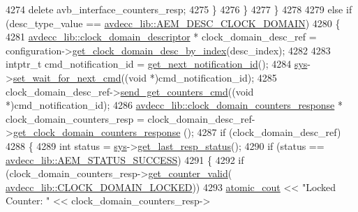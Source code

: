 \begin{DoxyCode}
4274                 \textcolor{keyword}{delete} avb\_interface\_counters\_resp;
4275             \}
4276         \}
4277     \}
4278 
4279     \textcolor{keywordflow}{else} \textcolor{keywordflow}{if} (desc\_type\_value == \hyperlink{namespaceavdecc__lib_ac7b7d227e46bc72b63ee9e9aae15902fa9a2f5c4896329bb03b27b36e98ed5e93}{avdecc\_lib::AEM\_DESC\_CLOCK\_DOMAIN})
4280     \{
4281         \hyperlink{classavdecc__lib_1_1clock__domain__descriptor}{avdecc\_lib::clock\_domain\_descriptor} * clock\_domain\_desc\_ref = 
      configuration->\hyperlink{classavdecc__lib_1_1configuration__descriptor_ab5603e0fa2cc0695b240fe856b62776d}{get\_clock\_domain\_desc\_by\_index}(desc\_index);
4282 
4283         intptr\_t cmd\_notification\_id = \hyperlink{classcmd__line_a57486218387d1aa9d262eb7c176154ad}{get\_next\_notification\_id}();
4284         \hyperlink{classcmd__line_a485db4800e331cb4052c447fdf5d154e}{sys}->\hyperlink{classavdecc__lib_1_1system_a26b769584f10225077da47583edda33e}{set\_wait\_for\_next\_cmd}((\textcolor{keywordtype}{void} *)cmd\_notification\_id);
4285         clock\_domain\_desc\_ref->\hyperlink{classavdecc__lib_1_1clock__domain__descriptor_ab657b0af297908406798934243812b7c}{send\_get\_counters\_cmd}((\textcolor{keywordtype}{void} *)cmd\_notification\_id);
4286         \hyperlink{classavdecc__lib_1_1clock__domain__counters__response}{avdecc\_lib::clock\_domain\_counters\_response} * 
      clock\_domain\_counters\_resp = clock\_domain\_desc\_ref->\hyperlink{classavdecc__lib_1_1clock__domain__descriptor_a97db0baabe6eeab0c0cf651d4e349ac3}{get\_clock\_domain\_counters\_response}
      ();
4287         \textcolor{keywordflow}{if} (clock\_domain\_desc\_ref)
4288         \{
4289             \textcolor{keywordtype}{int} status = \hyperlink{classcmd__line_a485db4800e331cb4052c447fdf5d154e}{sys}->\hyperlink{classavdecc__lib_1_1system_aa63e8d1a4e51f695cdcccc9340922407}{get\_last\_resp\_status}();
4290             \textcolor{keywordflow}{if} (status == \hyperlink{namespaceavdecc__lib_affd436edb2cecd20cfd784a84f852b2bac947077909cb590b84f4b5db413080e0}{avdecc\_lib::AEM\_STATUS\_SUCCESS})
4291             \{
4292                 \textcolor{keywordflow}{if} (clock\_domain\_counters\_resp->\hyperlink{classavdecc__lib_1_1clock__domain__counters__response_a1a714d004a3ca8b521311ba4d3e62e93}{get\_counter\_valid}(
      \hyperlink{namespaceavdecc__lib_a831be56dba8ac423258a9374a1202df4a956e33777cd5b1499e9c1e3aba85afbd}{avdecc\_lib::CLOCK\_DOMAIN\_LOCKED}))
4293                     \hyperlink{cmd__line_8h_a0bc38ccc65c79ba06c6fcd7b4bf554c3}{atomic\_cout} << \textcolor{stringliteral}{"Locked Counter: "} << clock\_domain\_counters\_resp->

\end{DoxyCode}
